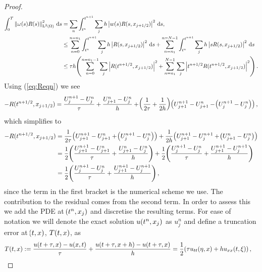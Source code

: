 \documentclass[final]{amsart}
\renewcommand{\d}{\ensuremath{\,\mathrm{d}}}
\numberwithin{equation}{section}
\begin{document}
\begin{proof}
\begin{equation}\label{eq:bound}
  \begin{split}
    \int_0^T \Norm{\w(s) R(s)}_{\leb{2}(\W)}^2 \d s
    &=
    \sum_n \int_{t^n}^{t^{n+1}}
    \sum_{j} h \norm{w(s) R(s, x_{j+1/2})}^2 \d s,
    \\
    &\leq
    \sum_{n=0}^{n=n_1} \int_{t^n}^{t^{n+1}}
    \sum_{j} h \norm{R(s, x_{j+1/2})}^2 \d s
    +
    \sum_{n=n_1}^{n=N-1}\int_{t^n}^{t^{n+1}}
    \sum_{j} h \norm{s R(s, x_{j+1/2})}^2 \d s
    \\
    &\leq
   \tau h\qp{ \sum_{n=0}^{n=n_1-1}
   	\sum_{j} \norm{ R(t^{n+1/2}, x_{j+1/2})}^2
   	+
   	\sum_{n=n_1}^{N-1}
   	\sum_{j} \norm{t^{n+1/2} R(t^{n+1/2}, x_{j+1/2})}^2}
    .
  \end{split}
\end{equation}
Using (\ref{eq:Reqn}) we see
\begin{equation}\label{eq:residual_expression}
  -R(t^{n+1/2}, x_{j+1/2})
  =
  \frac{U^{n+1}_{j}-U^n_{j}}{\tau}
  +
  \frac{U^n_{j+1}-U^n_j}{h}
  +
  \!\left({\frac{1}{2\tau}+\frac{1}{2h}}\right)\!\left({U^{n+1}_{j+1} - U^{n}_{j+1} - \!\left({U^{n+1}_j - U^n_j}\right)}\right),
\end{equation}
which simplifies to 
\begin{equation}\label{eq:Residual_scheme_form_BTFS}
\begin{aligned}
-R(t^{n+1/2}, x_{j+1/2})&=\frac{1}{2\tau}\!\left({U^{n+1}_{j+1} - U^{n}_{j+1} + \!\left({U^{n+1}_j - U^n_j}\right)}\right)
+
\frac{1}{2h}\!\left({U^{n+1}_{j+1} - U^{n+1}_{j} + \!\left({U^{n}_{j+1} - U^n_j}\right)}\right)\\
&=
\frac{1}{2}\!\left({\frac{U^{n+1}_{j+1} - U^{n}_{j+1}}{\tau}+
\frac{U^{n}_{j+1} - U^n_j}{h}}\right)
+
\frac{1}{2}\!\left({\frac{U^{n+1}_j - U^n_j}{\tau}+\frac{U^{n+1}_{j+1} - U^{n+1}_{j} }{h}}\right)\\
&=
\frac{1}{2}\!\left({\frac{U^{n+1}_j - U^n_j}{\tau}+\frac{U^{n+1}_{j+1} - U^{n+1}_{j} }{h}}\right),
\end{aligned}
\end{equation}
since the term in the first bracket is the numerical scheme we use.   The contribution to the residual comes from the second term.  In order to assess this we add the PDE at $\!\left({t^n, x_j}\right)$ and discretise the resulting terms.  For ease of notation we will denote the exact solution $u\!\left({t^n,x_j}\right)$ as $u^n_j$ and define a truncation error at $\!\left({t,x}\right)$, $T\!\left({t,x}\right)$, as
\begin{equation}
\begin{aligned}
T\qp{t,x}&:=\frac{u\qp{t+\tau,x}-u\qp{x,t}}{\tau}+\frac{u\qp{t+\tau,x+h}-u\qp{t+\tau,x}}{h}=\frac{1}{2}\qp{ \tau u_{tt}\qp{\eta,x} +hu_{xx}\qp{t,\xi} },

\end{aligned}
\end{equation}
\end{proof}
\end{document}

